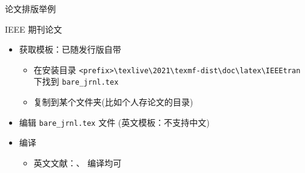 \begin{frame}[fragile]{论文排版举例}
  \begin{block}{IEEE 期刊论文}
    \begin{itemize}
      \item 获取模板：已随发行版自带
            \begin{itemize}
              \item 在安装目录 \verb|<prefix>\texlive\2021\texmf-dist\doc\latex\IEEEtran|
                    下找到 \verb|bare_jrnl.tex|
              \item 复制到某个文件夹(比如个人存论文的目录)
            \end{itemize}
      \item 编辑 \verb|bare_jrnl.tex| 文件 (英文模板：不支持中文)
      \item 编译
            \begin{itemize}
              \item 英文文献：\XeLaTeX{}、\pdfLaTeX{} 编译均可
            \end{itemize}
    \end{itemize}
  \end{block}
\end{frame}